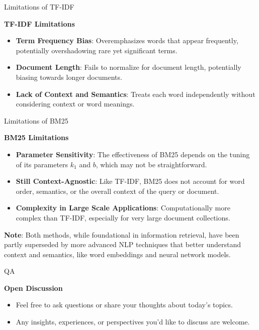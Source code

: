 \documentclass{beamer}
\begin{document}
\begin{frame}{Limitations of TF-IDF}

\textbf{TF-IDF Limitations}
\begin{itemize}
  \item \textbf{Term Frequency Bias}: Overemphasizes words that appear frequently, potentially overshadowing rare yet significant terms.
  \item \textbf{Document Length}: Fails to normalize for document length, potentially biasing towards longer documents.
  \item \textbf{Lack of Context and Semantics}: Treats each word independently without considering context or word meanings.
\end{itemize}
\end{frame}

\begin{frame}{Limitations of BM25}

\textbf{BM25 Limitations}
\begin{itemize}
  \item \textbf{Parameter Sensitivity}: The effectiveness of BM25 depends on the tuning of its parameters \( k_1 \) and \( b \), which may not be straightforward.
  \item \textbf{Still Context-Agnostic}: Like TF-IDF, BM25 does not account for word order, semantics, or the overall context of the query or document.
  \item \textbf{Complexity in Large Scale Applications}: Computationally more complex than TF-IDF, especially for very large document collections.
\end{itemize}

\textbf{Note}: Both methods, while foundational in information retrieval, have been partly superseded by more advanced NLP techniques that better understand context and semantics, like word embeddings and neural network models.

\end{frame}


\begin{frame}{QA}

\textbf{Open Discussion}
\begin{itemize}
  \item Feel free to ask questions or share your thoughts about today's topics.
  \item Any insights, experiences, or perspectives you'd like to discuss are welcome.
\end{itemize}

\end{frame}
\end{document}

